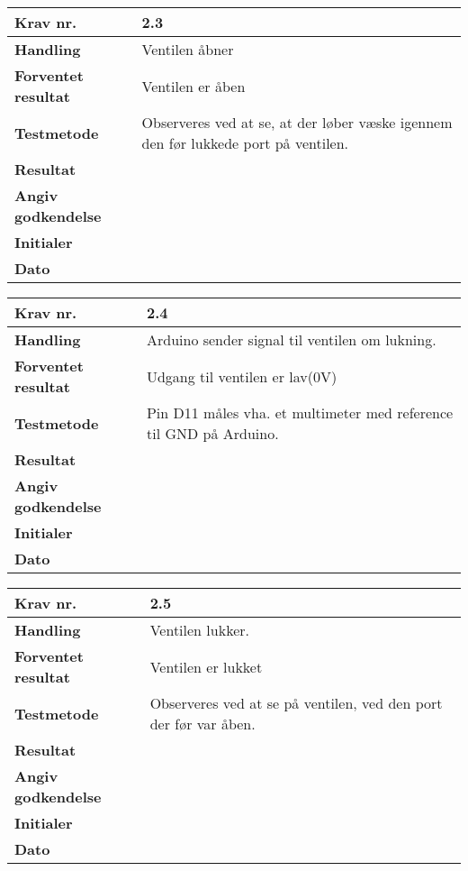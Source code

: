 	\begin{center}
		\begin{longtable}{ | m{4cm}| m{8.5cm}|} 
			\hline
			\textbf{Krav nr.} & 2.3  \\ 
			\hline
			\textbf{Handling} & Ventilen åbner   \\
			\hline
			\textbf{Forventet resultat} & Ventilen er åben \\
			\hline
			\textbf{Testmetode}  & Observeres ved at se, at der løber væske igennem den før lukkede port på ventilen.  \\
			\hline
			\textbf{Resultat}  &    \\
			\hline
			\textbf{Angiv godkendelse} &     \\
			\hline
			\textbf{Initialer} &     \\
			\hline
			\textbf{Dato} &    \\
			\hline
		\end{longtable}
	\end{center}
	
	\begin{center}
		\begin{longtable}{ | m{4cm}| m{8.5cm}|} 
			\hline
			\textbf{Krav nr.} & 2.4  \\ 
			\hline
			\textbf{Handling} & Arduino sender signal til ventilen om lukning.   \\
			\hline
			\textbf{Forventet resultat} & Udgang til ventilen er lav(0V) \\
			\hline
			\textbf{Testmetode}  & Pin D11 måles vha. et multimeter med reference til GND på Arduino.  \\
			\hline
			\textbf{Resultat}  &    \\
			\hline
			\textbf{Angiv godkendelse} &     \\
			\hline
			\textbf{Initialer} &     \\
			\hline
			\textbf{Dato} &    \\
			\hline
		\end{longtable}
	\end{center}	
	
	\begin{center}
		\begin{longtable}{ | m{4cm}| m{8.5cm}|} 
			\hline
			\textbf{Krav nr.} & 2.5  \\ 
			\hline
			\textbf{Handling} & Ventilen lukker. \\
			\hline
			\textbf{Forventet resultat} & Ventilen er lukket \\
			\hline
			\textbf{Testmetode}  & Observeres ved at se på ventilen, ved den port der før var åben.  \\
			\hline
			\textbf{Resultat}  &    \\
			\hline
			\textbf{Angiv godkendelse} &     \\
			\hline
			\textbf{Initialer} &     \\
			\hline
			\textbf{Dato} &    \\
			\hline
		\end{longtable}
	\end{center}